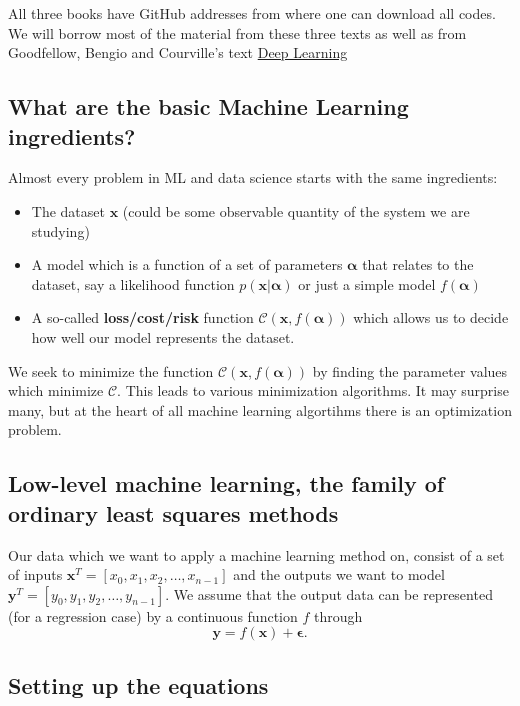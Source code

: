 \documentclass[%
oneside,                 %
final,                   %
10pt]{article}
\begin{document}
All three books have GitHub addresses from where  one can download all codes. We will borrow most of the material from these three texts as well as 
from Goodfellow, Bengio and Courville's text \href{{https://www.deeplearningbook.org/}}{Deep Learning}

\subsection{What are the basic Machine Learning ingredients?}
\begin{block}{}
Almost every problem in ML and data science starts with the same ingredients:
\begin{itemize}
\item The dataset $\bm{x}$ (could be some observable quantity of the system we are studying)

\item A model which is a function of a set of parameters $\bm{\alpha}$ that relates to the dataset, say a likelihood  function $p(\bm{x}\vert \bm{\alpha})$ or just a simple model $f(\bm{\alpha})$

\item A so-called \textbf{loss/cost/risk} function $\mathcal{C} (\bm{x}, f(\bm{\alpha}))$ which allows us to decide how well our model represents the dataset. 
\end{itemize}

\noindent
We seek to minimize the function $\mathcal{C} (\bm{x}, f(\bm{\alpha}))$ by finding the parameter values which minimize $\mathcal{C}$. This leads to  various minimization algorithms. It may surprise many, but at the heart of all machine learning algortihms there is an optimization problem. 
\end{block}

\subsection{Low-level machine learning, the family of ordinary least squares methods}

Our data which we want to apply a machine learning method on, consist
of a set of inputs $\bm{x}^T=[x_0,x_1,x_2,\dots,x_{n-1}]$ and the
outputs we want to model $\bm{y}^T=[y_0,y_1,y_2,\dots,y_{n-1}]$.
We assume  that the output data can be represented (for a regression case) by a continuous function $f$
through
\[
\bm{y}=f(\bm{x})+\bm{\epsilon}.
\]

\subsection{Setting up the equations}
\end{document}
